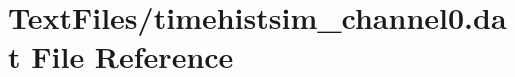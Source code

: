 \hypertarget{TextFiles_2timehistsim__channel0_8dat}{}\section{Text\+Files/timehistsim\+\_\+channel0.dat File Reference}
\label{TextFiles_2timehistsim__channel0_8dat}
